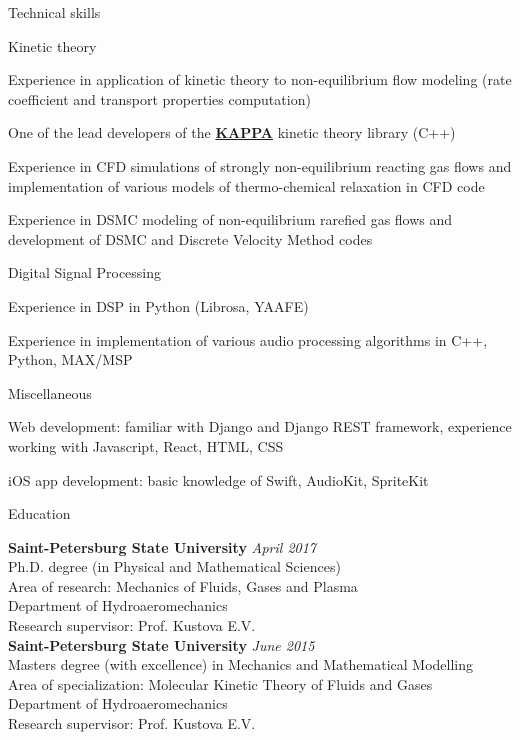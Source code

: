 \documentclass{resume} %
\begin{document}
\begin{rSection}{Technical skills}
\begin{rSubsection}{Kinetic theory}{}{}{}
\item Experience in application of kinetic theory to non-equilibrium flow modeling (rate coefficient and transport properties computation)
\item One of the lead developers of the {\bf \href{https://github.com/lkampoli/kappa}{KAPPA}} kinetic theory library (C++)
\item Experience in CFD simulations of strongly non-equilibrium reacting gas flows and implementation of various models of thermo-chemical relaxation in CFD code
\item Experience in DSMC modeling of non-equilibrium rarefied gas flows and development of DSMC and Discrete Velocity Method codes
\end{rSubsection}

\begin{rSubsection}{Digital Signal Processing}{}{}{}
\item Experience in DSP in Python (Librosa, YAAFE)
\item Experience in implementation of various audio processing algorithms in C++, Python, MAX/MSP
\end{rSubsection}

\begin{rSubsection}{Miscellaneous}{}{}{}
\item Web development: familiar with Django and Django REST framework, experience working with Javascript, React, HTML, CSS
\item iOS app development: basic knowledge of Swift, AudioKit, SpriteKit
\end{rSubsection}
\pagebreak
\begin{rSection}{Education}

{\bf Saint-Petersburg State University} \hfill {\em April 2017} \\ 
Ph.D. degree (in Physical and Mathematical Sciences)\\
Area of research: Mechanics of Fluids, Gases and Plasma \\
Department of Hydroaeromechanics \smallskip \\
Research supervisor: Prof. Kustova E.V. \\

{\bf Saint-Petersburg State University} \hfill {\em June 2015} \\ 
Masters degree (with excellence) in Mechanics and Mathematical Modelling\\
Area of specialization: Molecular Kinetic Theory of Fluids and Gases\\
Department of Hydroaeromechanics \smallskip \\
Research supervisor: Prof. Kustova E.V. \\


\end{rSection}
\end{rSection}
\end{document}
